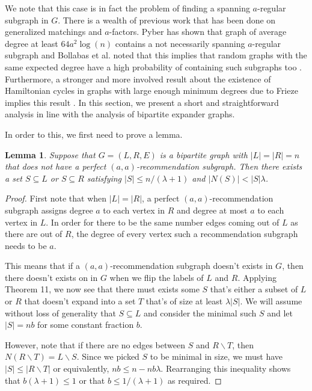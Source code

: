 \documentclass[11pt]{article}
\newtheorem{lem}[thm]{Lemma}
\newcommand{\vs}{\vspace{0.2cm}}
\begin{document}
We note that this case is in fact the problem of finding a spanning $a$-regular subgraph in $G$. There is a wealth of previous work that has been done on generalized matchings and $a$-factors. Pyber has shown that graph of average degree at least $64a^2\log(n)$ contains a not necessarily spanning $a$-regular subgraph and Bollabas et al. noted that this implies that random graphs with the same expected degree have a high probability of containing such subgraphs too \cite{Bollobas2006, Pyber1985}. Furthermore, a stronger and more involved result about the existence of Hamiltonian cycles in graphs with large enough minimum degrees due to Frieze implies this result \cite{Frieze1988}. In this section, we present a short and straightforward analysis in line with the analysis of bipartite expander graphs.

In order to this, we first need to prove a lemma.

\begin{lem}
Suppose that $G=(L,R,E)$ is a bipartite graph with $|L|=|R|=n$ that does not have a perfect $(a,a)$-recommendation subgraph. Then there exists a set $S\subseteq L$ or $S\subseteq R$ satisfying $|S|\leq n/(\lambda+1)$ and $|N(S)| < |S|\lambda$.
\end{lem}

\begin{proof}
First note that when $|L|=|R|$, a perfect $(a,a)$-recommendation subgraph assigns degree $a$ to each vertex in $R$ and degree at most $a$ to each vertex in $L$. In order for there to be the same number edges coming out of $L$ as there are out of $R$, the degree of every vertex such a recommendation subgraph needs to be $a$.\vs

This means that if a $(a,a)$-recommendation subgraph doesn't exists in $G$, then there doesn't exists on in $G$ when we flip the labels of $L$ and $R$. Applying Theorem 11, we now see that there must exists some $S$ that's either a subset of $L$ or $R$ that doesn't expand into a set $T$ that's of size at least $\lambda|S|$. We will assume without loss of generality that $S\subseteq L$ and consider the minimal such $S$ and let $|S|=nb$ for some constant fraction $b$. \vs

However, note that if there are no edges between $S$ and $R\backslash T$, then $N(R\backslash T) = L\backslash S$. Since we picked $S$ to be minimal in size, we must have $|S|\leq |R\backslash T|$ or equivalently, $nb \leq n -nb\lambda$. Rearranging this inequality shows that $b(\lambda+1) \leq 1$ or that $b\leq 1/(\lambda+1)$ as required.
\end{proof}
\end{document}

